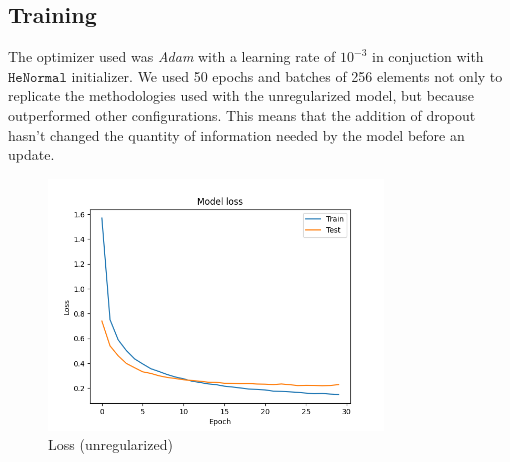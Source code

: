 \documentclass[compsoc]{IEEEtran}
\begin{document}
\subsection{Training}
The optimizer used was \emph{Adam} with a learning rate of $10^{-3}$ in conjuction with $\texttt{HeNormal}$ initializer. We used 50 epochs and batches of 256 elements 
not only to replicate the methodologies used with the unregularized model, but because outperformed other configurations. This means that the addition of dropout hasn't changed the quantity of information needed by the model before an update.



\begin{figure}[ht!]
\centering                                                                        
\includegraphics[width=3.5in]{../images/reg/loss-LeakyReLU-NoneType-categorical_crossentropy-Adam-50-256-0.1.png}
\captionsetup{justification=centering}                                                                                                                              
\caption{Loss (unregularized)}
\label{fig:loss2}                                                                                                                                                           
\end{figure}
\end{document}
